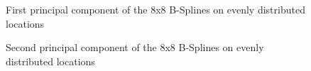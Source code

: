 \documentclass[
]{article}
\begin{document}
\begin{figure}


\caption{\label{fig-pc1-surf}First principal component of the 8x8
B-Splines on evenly distributed locations}

\end{figure}%

\begin{figure}


\caption{\label{fig-pc2-surf}Second principal component of the 8x8
B-Splines on evenly distributed locations}

\end{figure}%
\end{document}
